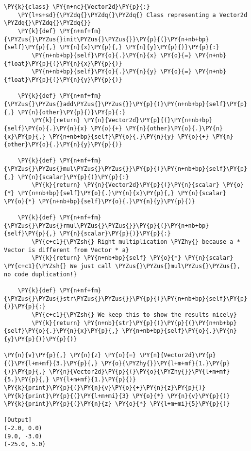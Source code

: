 \begin{Verbatim}[label=\makebox{\url{https://github.com/lucabaldini/cmepda/tree/master/slides/latex/snippets/vector2d\_math.py}},commandchars=\\\{\}]
\PY{k}{class} \PY{n+nc}{Vector2d}\PY{p}{:}
    \PY{l+s+sd}{\PYZdq{}\PYZdq{}\PYZdq{} Class representing a Vector2d \PYZdq{}\PYZdq{}\PYZdq{}}   
    \PY{k}{def} \PY{n+nf+fm}{\PYZus{}\PYZus{}init\PYZus{}\PYZus{}}\PY{p}{(}\PY{n+nb+bp}{self}\PY{p}{,} \PY{n}{x}\PY{p}{,} \PY{n}{y}\PY{p}{)}\PY{p}{:}
        \PY{n+nb+bp}{self}\PY{o}{.}\PY{n}{x} \PY{o}{=} \PY{n+nb}{float}\PY{p}{(}\PY{n}{x}\PY{p}{)}
        \PY{n+nb+bp}{self}\PY{o}{.}\PY{n}{y} \PY{o}{=} \PY{n+nb}{float}\PY{p}{(}\PY{n}{y}\PY{p}{)}
   
    \PY{k}{def} \PY{n+nf+fm}{\PYZus{}\PYZus{}add\PYZus{}\PYZus{}}\PY{p}{(}\PY{n+nb+bp}{self}\PY{p}{,} \PY{n}{other}\PY{p}{)}\PY{p}{:}
        \PY{k}{return} \PY{n}{Vector2d}\PY{p}{(}\PY{n+nb+bp}{self}\PY{o}{.}\PY{n}{x} \PY{o}{+} \PY{n}{other}\PY{o}{.}\PY{n}{x}\PY{p}{,} \PY{n+nb+bp}{self}\PY{o}{.}\PY{n}{y} \PY{o}{+} \PY{n}{other}\PY{o}{.}\PY{n}{y}\PY{p}{)}
    
    \PY{k}{def} \PY{n+nf+fm}{\PYZus{}\PYZus{}mul\PYZus{}\PYZus{}}\PY{p}{(}\PY{n+nb+bp}{self}\PY{p}{,} \PY{n}{scalar}\PY{p}{)}\PY{p}{:}
        \PY{k}{return} \PY{n}{Vector2d}\PY{p}{(}\PY{n}{scalar} \PY{o}{*} \PY{n+nb+bp}{self}\PY{o}{.}\PY{n}{x}\PY{p}{,} \PY{n}{scalar} \PY{o}{*} \PY{n+nb+bp}{self}\PY{o}{.}\PY{n}{y}\PY{p}{)}
        
    \PY{k}{def} \PY{n+nf+fm}{\PYZus{}\PYZus{}rmul\PYZus{}\PYZus{}}\PY{p}{(}\PY{n+nb+bp}{self}\PY{p}{,} \PY{n}{scalar}\PY{p}{)}\PY{p}{:}
        \PY{c+c1}{\PYZsh{} Right multiplication \PYZhy{} because a * Vector is different from Vector * a}
        \PY{k}{return} \PY{n+nb+bp}{self} \PY{o}{*} \PY{n}{scalar} \PY{c+c1}{\PYZsh{} We just call \PYZus{}\PYZus{}mul\PYZus{}\PYZus{}, no code duplication!}
        
    \PY{k}{def} \PY{n+nf+fm}{\PYZus{}\PYZus{}str\PYZus{}\PYZus{}}\PY{p}{(}\PY{n+nb+bp}{self}\PY{p}{)}\PY{p}{:}
        \PY{c+c1}{\PYZsh{} We keep this to show the results nicely}
        \PY{k}{return} \PY{n+nb}{str}\PY{p}{(}\PY{p}{(}\PY{n+nb+bp}{self}\PY{o}{.}\PY{n}{x}\PY{p}{,} \PY{n+nb+bp}{self}\PY{o}{.}\PY{n}{y}\PY{p}{)}\PY{p}{)}
     
\PY{n}{v}\PY{p}{,} \PY{n}{z} \PY{o}{=} \PY{n}{Vector2d}\PY{p}{(}\PY{l+m+mf}{3.}\PY{p}{,} \PY{o}{\PYZhy{}}\PY{l+m+mf}{1.}\PY{p}{)}\PY{p}{,} \PY{n}{Vector2d}\PY{p}{(}\PY{o}{\PYZhy{}}\PY{l+m+mf}{5.}\PY{p}{,} \PY{l+m+mf}{1.}\PY{p}{)}
\PY{k}{print}\PY{p}{(}\PY{n}{v}\PY{o}{+}\PY{n}{z}\PY{p}{)}
\PY{k}{print}\PY{p}{(}\PY{l+m+mi}{3} \PY{o}{*} \PY{n}{v}\PY{p}{)}
\PY{k}{print}\PY{p}{(}\PY{n}{z} \PY{o}{*} \PY{l+m+mi}{5}\PY{p}{)}

[Output]
(-2.0, 0.0)
(9.0, -3.0)
(-25.0, 5.0)
\end{Verbatim}